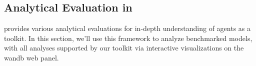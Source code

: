 



\subsection{Analytical Evaluation in \BenchName{}}

\BenchName{} provides various analytical evaluations for in-depth understanding of agents as a toolkit. In this section, we'll use this framework to analyze benchmarked models, with all analyses supported by our toolkit via interactive visualizations on the wandb web panel.

